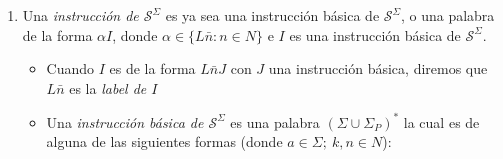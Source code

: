 \documentclass[
]{article}
\providecommand{\tightlist}{%
  \setlength{\itemsep}{0pt}\setlength{\parskip}{0pt}}
\begin{document}
\begin{enumerate}
\def\labelenumi{\arabic{enumi}.}
\tightlist
\item
  Una \emph{instrucción de \(\mathcal{S}^\Sigma\)} es ya sea una
  instrucción básica de \(\mathcal{S}^\Sigma\), o una palabra de la
  forma \(\alpha I\), donde \(\alpha\in\{L\bar{n}:n\in N\}\) e \(I\) es
  una instrucción básica de \(\mathcal{S}^\Sigma\).

  \begin{itemize}
  \tightlist
  \item
    Cuando \(I\) es de la forma \(L\bar{n}J\) con \(J\) una instrucción
    básica, diremos que \(L\bar{n}\) es la \emph{label de \(I\)}
  \item
    Una \emph{instrucción básica de \(\mathcal{S}^\Sigma\)} es una
    palabra \((\Sigma\cup\Sigma_P)^*\) la cual es de alguna de las
    siguientes formas (donde \(a\in\Sigma;\ k,n\in N\)):


\end{itemize}
\end{enumerate}
\end{document}
